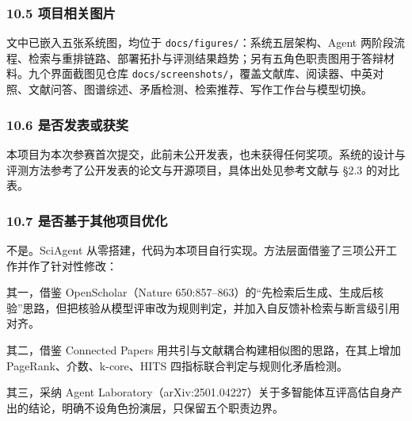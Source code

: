 \documentclass[UTF8,fontset=windows,zihao=5,a4paper]{ctexart}
\begin{document}
\subsubsection*{10.5 项目相关图片}
文中已嵌入五张系统图，均位于 \texttt{docs/figures/}：系统五层架构、Agent 两阶段流程、检索与重排链路、部署拓扑与评测结果趋势；另有五角色职责图用于答辩材料。九个界面截图见仓库 \texttt{docs/screenshots/}，覆盖文献库、阅读器、中英对照、文献问答、图谱综述、矛盾检测、检索推荐、写作工作台与模型切换。

\subsubsection*{10.6 是否发表或获奖}
本项目为本次参赛首次提交，此前未公开发表，也未获得任何奖项。系统的设计与评测方法参考了公开发表的论文与开源项目，具体出处见参考文献与 §2.3 的对比表。

\subsubsection*{10.7 是否基于其他项目优化}
不是。SciAgent 从零搭建，代码为本项目自行实现。方法层面借鉴了三项公开工作并作了针对性修改：

其一，借鉴 OpenScholar（Nature 650:857–863）的“先检索后生成、生成后核验”思路，但把核验从模型评审改为规则判定，并加入自反馈补检索与断言级引用对齐。

其二，借鉴 Connected Papers 用共引与文献耦合构建相似图的思路，在其上增加 PageRank、介数、k-core、HITS 四指标联合判定与规则化矛盾检测。

其三，采纳 Agent Laboratory（arXiv:2501.04227）关于多智能体互评高估自身产出的结论，明确不设角色扮演层，只保留五个职责边界。

\nocite{*}

\end{document}
